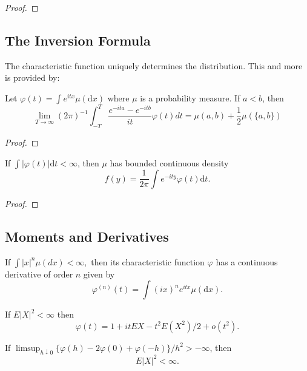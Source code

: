 \begin{proof}

\end{proof}

\subsection{The Inversion Formula}

The characteristic function uniquely determines the distribution. This and more is provided by:
\begin{theorem}
    Let $\varphi(t)=\int e^{itx}\mu(\mathrm{d}x)$ where $\mu$ is a probability measure. If $a<b$, then
    \begin{equation}
        \lim _{T \rightarrow \infty}(2 \pi)^{-1} \int_{-T}^{T} \frac{e^{-i t a}-e^{-i t b}}{i t} \varphi(t) d t=\mu(a, b)+\frac{1}{2} \mu(\{a, b\})
    \end{equation}
\end{theorem}

\begin{proof}

\end{proof}

\begin{theorem}
    If $\int|\varphi(t)|\mathrm{d}t<\infty$, then $\mu$ has bounded continuous density
    \begin{equation}
        f(y)=\frac{1}{2\pi}\int e^{-ity}\varphi(t) \mathrm{d}t.
    \end{equation}
\end{theorem}

\begin{proof}

\end{proof}

\subsection{Moments and Derivatives}

\begin{theorem}
    If $\int|x|^{n}\mu(d x)<\infty,$ then its characteristic function $\varphi$ has a continuous derivative of order $n$ given by
    \begin{equation}
        \varphi^{(n)}(t)=\int(i x)^{n}e^{itx}\mu(\mathrm{d}x).
    \end{equation}
\end{theorem}

\begin{theorem}
    If $E|X|^{2}<\infty$ then
    \begin{equation}
        \varphi(t)=1+itEX-t^{2}E\left(X^{2}\right)/2+o\left(t^{2}\right).
    \end{equation}
\end{theorem}

\begin{theorem}
    If $\limsup_{h\downarrow 0}\{\varphi(h)-2\varphi(0)+\varphi(-h)\}/h^{2}>-\infty$, then
    \begin{equation}
        E|X|^{2}<\infty.
    \end{equation}
\end{theorem}
